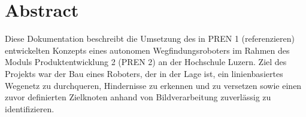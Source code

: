 \section*{Abstract}


Diese Dokumentation beschreibt die Umsetzung des in PREN 1 (referenzieren) entwickelten Konzepts eines autonomen Wegfindungsroboters im Rahmen des Moduls Produktentwicklung 2 (PREN 2) an der Hochschule Luzern. Ziel des Projekts war der Bau eines Roboters, der in der Lage ist, ein linienbasiertes Wegenetz zu durchqueren, Hindernisse zu erkennen und zu versetzen sowie einen zuvor definierten Zielknoten anhand von Bildverarbeitung zuverlässig zu identifizieren.



